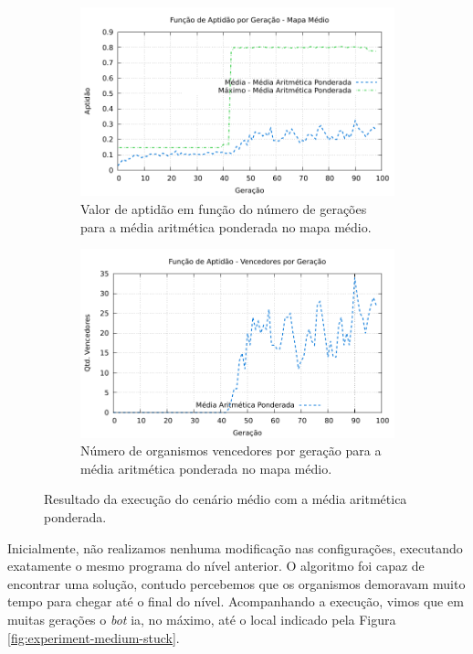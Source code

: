 \begin{figure}[H]
\centering
	\begin{subfigure}[b]{0.45\textwidth}
        \includegraphics[width=\textwidth]{fig/medium-wam-fitness-experiment.pdf}
        \caption{Valor de aptidão em função do número de gerações para a média
        aritmética ponderada no mapa médio.}
	\end{subfigure}
	\begin{subfigure}[b]{0.45\textwidth}
        \includegraphics[width=\textwidth]{fig/medium-wam-winners-experiment.pdf}
        \caption{Número de organismos vencedores por geração para a média
        aritmética ponderada no mapa médio.}
	\end{subfigure}

    \caption{Resultado da execução do cenário médio com a média aritmética
    ponderada.}
	\label{fig:medium-wam-experiment}
\end{figure}

Inicialmente, não realizamos nenhuma modificação nas configurações, executando
exatamente o mesmo programa do nível anterior. O algoritmo foi capaz de
encontrar uma solução, contudo percebemos que os organismos demoravam muito
tempo para chegar até o final do nível.  Acompanhando a execução, vimos que em
muitas gerações o \textit{bot} ia, no máximo, até o local indicado pela Figura
\ref{fig:experiment-medium-stuck}.


